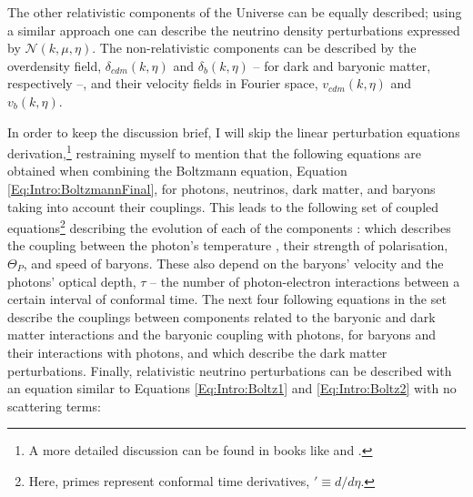 \qquad The other relativistic components of the Universe can be equally described; using a similar approach one can describe the neutrino density perturbations expressed by $\mathcal{N}(k,\mu,\eta)$. The non-relativistic components can be described by the overdensity field, $\delta_{cdm}(k,\eta)$ and $\delta_b(k,\eta)$ -- for dark and baryonic matter, respectively --, and their velocity fields in Fourier space, $v_{cdm}(k,\eta)$ and $v_{b}(k,\eta)$.  

\qquad In order to keep the discussion brief, I will skip the linear perturbation equations derivation,\footnote{A more detailed discussion can be found in books like \cite{padmanabhan_1999,Peacock} and \cite{dods}.} restraining myself to mention that the following equations are obtained when combining the Boltzmann equation, Equation \eqref{Eq:Intro:BoltzmannFinal}, for photons, neutrinos, dark matter, and baryons taking into account their couplings. This leads to the following set of coupled equations\footnote{Here, primes represent conformal time derivatives, $' \equiv d/d\eta$.} describing the evolution of each of the components \citep{dods}:
which describes the coupling between the photon's temperature , their strength of polarisation, $\Theta_P$, and speed of baryons. These also depend on the baryons' velocity and the photons' optical depth, $\tau$ -- the number of photon-electron interactions between a certain interval of conformal time. The next four following equations in the set describe the couplings between components related to the baryonic and dark matter interactions and the baryonic coupling with photons, 
for baryons and their interactions with photons, and
which describe the dark matter perturbations. Finally, relativistic neutrino perturbations can be described with an equation similar to Equations \eqref{Eq:Intro:Boltz1} and \eqref{Eq:Intro:Boltz2} with no scattering terms:

